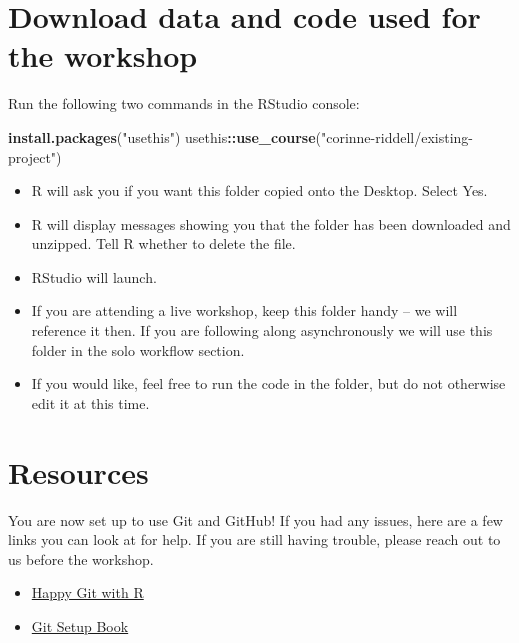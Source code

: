 \documentclass[
]{book}
\newenvironment{Shaded}{\begin{snugshade}}{\end{snugshade}}
\newcommand{\FunctionTok}[1]{\textcolor[rgb]{0.13,0.29,0.53}{\textbf{#1}}}
\newcommand{\NormalTok}[1]{#1}
\newcommand{\SpecialCharTok}[1]{\textcolor[rgb]{0.81,0.36,0.00}{\textbf{#1}}}
\newcommand{\StringTok}[1]{\textcolor[rgb]{0.31,0.60,0.02}{#1}}
\providecommand{\tightlist}{%
  \setlength{\itemsep}{0pt}\setlength{\parskip}{0pt}}
\begin{document}
\section{Download data and code used for the workshop}\label{download-data-and-code-used-for-the-workshop}

Run the following two commands in the RStudio console:

\begin{Shaded}
\begin{Highlighting}[]
\FunctionTok{install.packages}\NormalTok{(}\StringTok{"usethis"}\NormalTok{)}
\NormalTok{usethis}\SpecialCharTok{::}\FunctionTok{use\_course}\NormalTok{(}\StringTok{"corinne{-}riddell/existing{-}project"}\NormalTok{)}
\end{Highlighting}
\end{Shaded}

\begin{itemize}
\tightlist
\item
  R will ask you if you want this folder copied onto the Desktop. Select Yes.
\item
  R will display messages showing you that the folder has been downloaded and unzipped.
  Tell R whether to delete the file.
\item
  RStudio will launch.
\item
  If you are attending a live workshop, keep this folder handy -- we will reference
  it then. If you are following along asynchronously we will use this folder in the
  solo workflow section.
\item
  If you would like, feel free to run the code in the folder, but do not otherwise
  edit it at this time.
\end{itemize}

\section{Resources}\label{resources}

You are now set up to use Git and GitHub! If you had any issues, here are
a few links you can look at for help. If you are still having trouble, please
reach out to us before the workshop.

\begin{itemize}
\item
  \href{https://happygitwithr.com/}{Happy Git with R}
\item
  \href{https://git-scm.com/book/en/v2/Getting-Started-About-Version-ControlLinks}{Git Setup Book}
\end{itemize}
\end{document}
